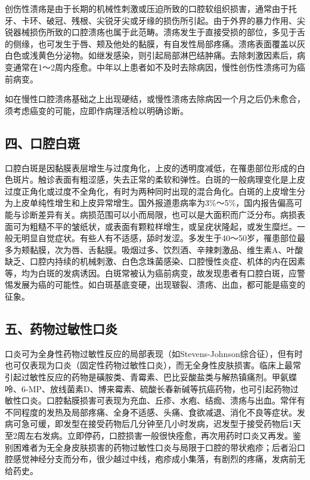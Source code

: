 创伤性溃疡是由于长期的机械性刺激或压迫所致的口腔软组织损害，通常由于托牙、卡环、破冠、残根、尖锐牙尖或牙缘的损伤所引起。由于外界的暴力作用、尖锐器械损伤所致的口腔溃疡也属于此范畴。溃疡发生于直接受损的部位，多见于舌的侧缘，也可发生于唇、颊及他处的黏膜，有自发性局部疼痛。溃疡表面覆盖以灰白色或浅黄色分泌物。如继发感染，则引起局部淋巴结肿痛。去除刺激因素后，病变通常在1～2周内痊愈。中年以上患者如不及时去除病因，慢性创伤性溃疡可为癌前病变。

如在慢性口腔溃疡基础之上出现硬结，或慢性溃疡去除病因一个月之后仍未愈合，须考虑癌变的可能，应即作病理活检以明确诊断。

\subsection{四、口腔白斑}

口腔白斑是因黏膜表层增生与过度角化，上皮的透明度减低，在罹患部位形成的白色斑片。触诊表面有粗涩感，失去正常的柔软和弹性。白斑的一般病理变化是上皮过度正角化或过度不全角化，有时为两种同时出现的混合角化。白斑的上皮增生分为上皮单纯性增生和上皮异常增生。国外报道患病率为3\%～5\%，国内报告偏高可能与诊断差异有关。病损范围可以小而局限，也可以是大面积而广泛分布。病损表面可为粗糙不平的皱纸状，或表面有颗粒样增生，或呈疣状隆起，或发生糜烂。一般无明显自觉症状。有些人有不适感，舔时发涩。多发生于40～50岁，罹患部位最多为颊黏膜，次为唇、舌黏膜。吸烟过多、饮烈酒、辛辣刺激品、维生素A、叶酸缺乏、口腔内持续的机械刺激、白色念珠菌感染、口腔慢性炎症、机体的内在因素等，均为白斑的发病诱因。白斑常被认为癌前病变，故发现患者有口腔白斑，应警惕发展为癌的可能性。如白斑基底变硬，出现皲裂、溃疡、出血，都可能是癌变的征象。

\subsection{五、药物过敏性口炎}

口炎可为全身性药物过敏性反应的局部表现（如Stevens-Johnson综合征），但有时也可仅表现为口炎（固定性药物过敏性口炎），而无全身性皮肤损害。临床上最常引起过敏性反应的药物是磺胺类、青霉素、巴比妥酸盐类与解热镇痛剂。甲氨蝶呤、6-MP、放线菌素D、博来霉素、硫酸长春新碱等抗癌药物，也可引起药物过敏性口炎。口腔黏膜损害可表现为充血、丘疹、水疱、结痂、溃疡与出血。常伴有不同程度的发热及局部疼痛、全身不适感、头痛、食欲减退、消化不良等症状。发病可急可缓，即发型在接受药物后几分钟至几小时发病，迟发型于接受药物后1天至2周左右发病。立即停药，口腔损害一般很快痊愈，再次用药时口炎又再发。鉴别困难者为无全身皮肤损害的药物过敏性口炎与局限于口腔的带状疱疹；后者沿口腔感觉神经分支而分布，很少越过中线，疱疹成小集落，有剧烈的疼痛，发病前无给药史。

